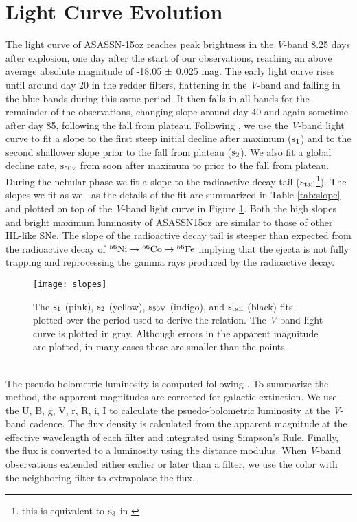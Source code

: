 \documentclass[a4paper,fleqn,usenatbib]{mnras}
\begin{document}
\section{Light Curve Evolution} \label{sec:LCEvolve}
The light curve of ASASSN-15oz reaches peak brightness in the {\it V}-band 8.25 days after explosion, one day after the start of our observations, reaching an above average absolute magnitude of -18.05 $\rm{\pm}$ 0.025 mag.
The early light curve rises until around day 20 in the redder filters, flattening in the {\it V}-band and falling in the blue bands during this same period. 
It then falls in all bands for the remainder of the observations, changing slope around day 40 and again sometime after day 85, following the fall from plateau. 
Following \citet{2014anderson}, we use the {\it V}-band light curve to fit a slope to the first steep initial decline after maximum ($\rm{s_1}$) and to the second shallower slope prior to the fall from plateau ($\rm{s_2}$). 
We also fit a global decline rate, $\rm{s_{50v}}$ from soon after maximum to prior to the fall from plateau.
During the nebular phase we fit a slope to the radioactive decay tail ($\rm{s_{tail}}$\footnote{this is equivalent to $\rm{s_{3}}$ in \citet{2014anderson}}). 
The slopes we fit as well as the details of the fit are summarized in Table \ref{tab:slope} and plotted on top of the {\it V}-band light curve in Figure \ref{fig:slopes}.
Both the high slopes and bright maximum luminosity of ASASSN15oz are similar to those of other IIL-like SNe. 
The slope of the radioactive decay tail is steeper than expected from the radioactive decay of $\rm{{}^{56}Ni \rightarrow {}^{56}Co \rightarrow {}^{56}Fe}$ implying that the ejecta is not fully trapping and reprocessing the gamma rays produced by the radioactive decay.
\begin{figure}
\begin{center}
\texttt{[image: slopes]} %
\caption{The $\rm{s_{1}}$ (pink), $\rm{s_{2}}$ (yellow), $\rm{s_{50V}}$ (indigo), and $\rm{ s_{tail}}$ (black) fits plotted over the period used to derive the relation. 
The {\it V}-band light curve is plotted in gray. 
Although errors in the apparent magnitude are plotted, in many cases these are smaller than the points.}
\label{fig:slopes}
\end{center}
\end{figure}\\
\indent The pseudo-bolometric luminosity is computed following \citet{2008valenti}.
To summarize the method, the apparent magnitudes are corrected for galactic extinction.
We use  the U, B, g, V, r, R, i, I to calculate the psuedo-bolometric luminosity at the {\it V}-band cadence.
The flux density is calculated from the apparent magnitude at the effective wavelength of each filter and integrated using Simpson's Rule. 
Finally, the flux is converted to a luminosity using the distance modulus. 
When {\it V}-band observations extended either earlier or later than a filter, we use the color with the neighboring filter to extrapolate the flux.
\end{document}
